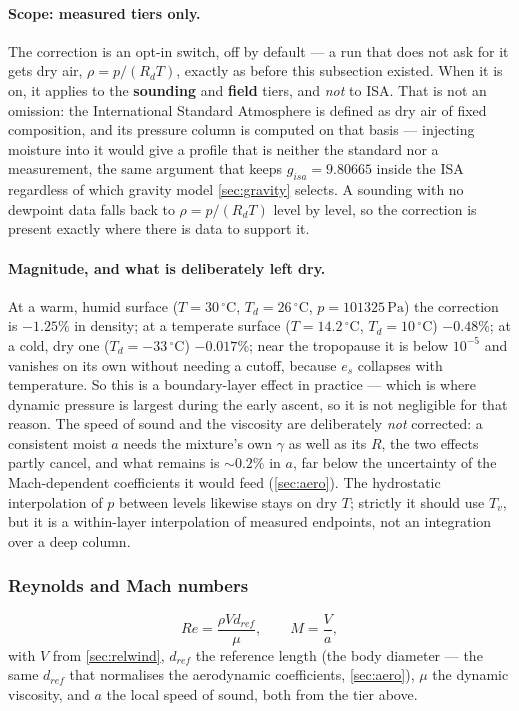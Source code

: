 \paragraph{Scope: measured tiers only.} The correction is an opt-in switch, off by default --- a
run that does not ask for it gets dry air, $\rho=p/(R_dT)$, exactly as before this subsection
existed. When it is on, it applies to the \textbf{sounding} and \textbf{field} tiers, and
\emph{not} to ISA. That is not an omission: the International Standard
Atmosphere is defined as dry air of fixed composition, and its pressure column is computed on that
basis --- injecting moisture into it would give a profile that is neither the standard nor a
measurement, the same argument that keeps $g_{isa}=9.80665$ inside the ISA regardless of which
gravity model \autoref{sec:gravity} selects. A sounding with no dewpoint data falls back to
$\rho=p/(R_dT)$ level by level, so the correction is present exactly where there is data to
support it.

\paragraph{Magnitude, and what is deliberately left dry.} At a warm, humid surface
($T=30\,^\circ\mathrm{C}$, $T_d=26\,^\circ\mathrm{C}$, $p=101325\,\mathrm{Pa}$) the correction is
$-1.25\%$ in density; at a temperate surface ($T=14.2\,^\circ\mathrm{C}$, $T_d=10\,^\circ\mathrm{C}$)
$-0.48\%$; at a cold, dry one ($T_d=-33\,^\circ\mathrm{C}$) $-0.017\%$; near the tropopause it is
below $10^{-5}$ and vanishes on its own without needing a cutoff, because $e_s$ collapses with
temperature. So this is a boundary-layer effect in practice --- which is where dynamic pressure is
largest during the early ascent, so it is not negligible for that reason. The speed of sound and
the viscosity are deliberately \emph{not} corrected: a consistent moist $a$ needs the mixture's own
$\gamma$ as well as its $R$, the two effects partly cancel, and what remains is $\sim0.2\%$ in $a$,
far below the uncertainty of the Mach-dependent coefficients it would feed
(\autoref{sec:aero}). The hydrostatic interpolation of $p$ between levels likewise stays on dry
$T$; strictly it should use $T_v$, but it is a within-layer interpolation of measured endpoints,
not an integration over a deep column.

\subsubsection{Reynolds and Mach numbers}\label{sec:reynolds_mach}
\begin{equation}
    Re = \frac{\rho V d_{ref}}{\mu}, \qquad M = \frac{V}{a},
\end{equation}
with $V$ from \autoref{sec:relwind}, $d_{ref}$ the reference length (the body diameter --- the
same $d_{ref}$ that normalises the aerodynamic coefficients, \autoref{sec:aero}), $\mu$ the
dynamic viscosity, and $a$ the local speed of sound, both from the tier above.

